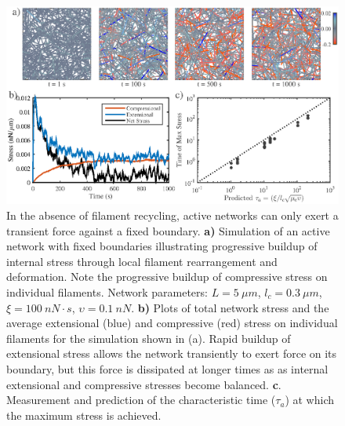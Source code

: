 \documentclass[10pt,letterpaper]{article}
\begin{document}
\begin{figure}[h!]
\centering
\includegraphics[width=\hsize]{figures/figure4b}
\caption{\label{fig:active_str} In the absence of filament recycling, active networks can only exert a transient force against a fixed boundary.  \textbf{a)} Simulation of an active network with fixed boundaries illustrating progressive buildup of internal stress through local filament rearrangement and deformation. Note the progressive buildup of compressive stress on individual filaments. Network parameters: $L=5\: \mu m$, $l_c=0.3\: \mu m$, $\xi=100\: nN\cdot s$, $\upsilon=0.1\: nN$.  \textbf{b)} Plots of total network stress and the average extensional (blue) and compressive (red) stress on individual filaments for the simulation shown in (a). Rapid buildup of extensional stress allows the network transiently to exert force on its boundary, but this force is dissipated at longer times as   as internal extensional and compressive stresses become balanced. \textbf{c}. Measurement and prediction of the characteristic time ($\tau_a$) at which the maximum stress is achieved. }
\end{figure}
\end{document}
